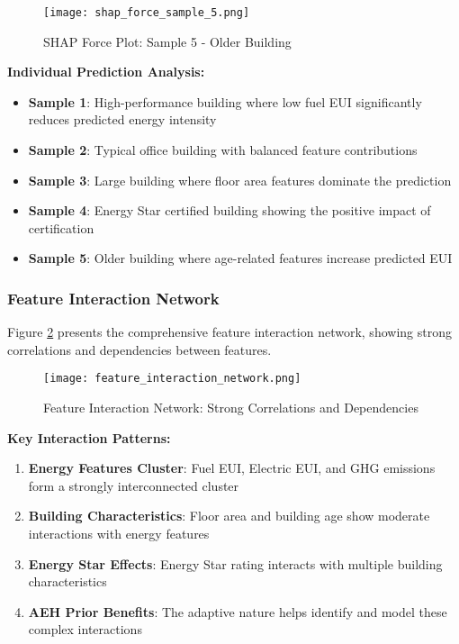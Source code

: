 \begin{figure}[h!]
\centering
\texttt{[image: shap\_force\_sample\_5.png]}
\caption{SHAP Force Plot: Sample 5 - Older Building}
\label{fig:shap_force_5}
\end{figure}

\textbf{Individual Prediction Analysis:}
\begin{itemize}
    \item \textbf{Sample 1}: High-performance building where low fuel EUI significantly reduces predicted energy intensity
    \item \textbf{Sample 2}: Typical office building with balanced feature contributions
    \item \textbf{Sample 3}: Large building where floor area features dominate the prediction
    \item \textbf{Sample 4}: Energy Star certified building showing the positive impact of certification
    \item \textbf{Sample 5}: Older building where age-related features increase predicted EUI
\end{itemize}

\subsubsection{Feature Interaction Network}

Figure \ref{fig:feature_interaction_network} presents the comprehensive feature interaction network, showing strong correlations and dependencies between features.

\begin{figure}[h!]
\centering
\texttt{[image: feature\_interaction\_network.png]}
\caption{Feature Interaction Network: Strong Correlations and Dependencies}
\label{fig:feature_interaction_network}
\end{figure}

\textbf{Key Interaction Patterns:}
\begin{enumerate}
    \item \textbf{Energy Features Cluster}: Fuel EUI, Electric EUI, and GHG emissions form a strongly interconnected cluster
    \item \textbf{Building Characteristics}: Floor area and building age show moderate interactions with energy features
    \item \textbf{Energy Star Effects}: Energy Star rating interacts with multiple building characteristics
    \item \textbf{AEH Prior Benefits}: The adaptive nature helps identify and model these complex interactions
\end{enumerate}

